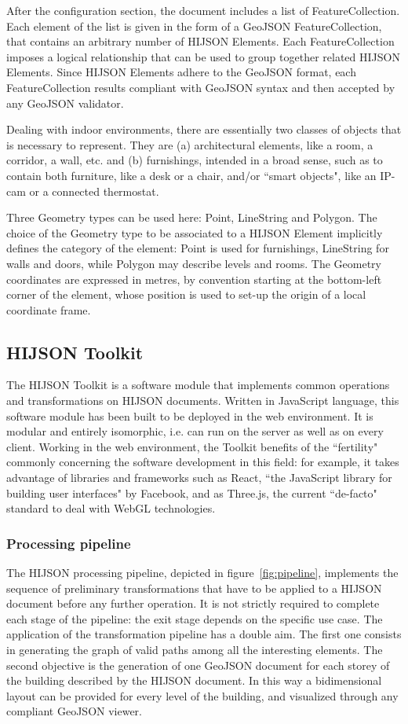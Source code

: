 \documentclass[]{egpubl}
\begin{document}
After the configuration section, the document includes a list of
FeatureCollection.  Each element of the list is given in the form of a GeoJSON
FeatureCollection, that contains an arbitrary number of HIJSON Elements. Each
FeatureCollection imposes a logical relationship that can be used to group
together related HIJSON Elements. Since HIJSON Elements adhere to the GeoJSON
format, each FeatureCollection results compliant with GeoJSON syntax and then
accepted by any GeoJSON validator.

Dealing with indoor environments, there are essentially two classes of objects
that is necessary to represent. They are (a) architectural elements, like a
room, a corridor, a wall, etc. and (b) furnishings, intended in a broad sense,
such as to contain both furniture, like a desk or a chair, and/or ``smart
objects", like an IP-cam or a connected thermostat.

Three Geometry types can be used here: Point, LineString and Polygon. The
choice of the Geometry type to be associated to a HIJSON Element implicitly
defines the category of the element: Point is used for furnishings, LineString
for walls and doors, while Polygon may describe levels and rooms. The Geometry
coordinates are expressed in metres, by convention starting at the bottom-left
corner of the element, whose position is used to set-up the origin of a local
coordinate frame.

\subsection{HIJSON Toolkit}

The HIJSON Toolkit is a software module that implements common operations and
transformations on HIJSON documents. Written in JavaScript language, this
software module has been built to be deployed in the web environment. It is
modular and entirely isomorphic, i.e. can run on the server as well as on
every client. Working in the web environment, the Toolkit benefits of the
``fertility" commonly concerning the software development in this field: for
example, it takes advantage of libraries and frameworks such as React, ``the
JavaScript library for building user interfaces" by Facebook, and as Three.js,
the current ``de-facto" standard to deal with WebGL technologies.

\subsubsection{Processing pipeline}  The HIJSON processing pipeline, depicted in
figure~\ref{fig:pipeline}, implements the sequence of preliminary
transformations that have to be applied to a HIJSON document before any
further operation. It is not strictly required to complete each stage of the
pipeline: the exit stage depends on the specific use case.
The application of the transformation pipeline has a double aim. The first one
consists in generating the graph of valid paths among all the interesting
elements. The second objective is the generation of one GeoJSON document for
each storey of the building described by the HIJSON document. In this way a
bidimensional layout can be provided for every level of the building, and
visualized through any compliant GeoJSON viewer.
\end{document}
